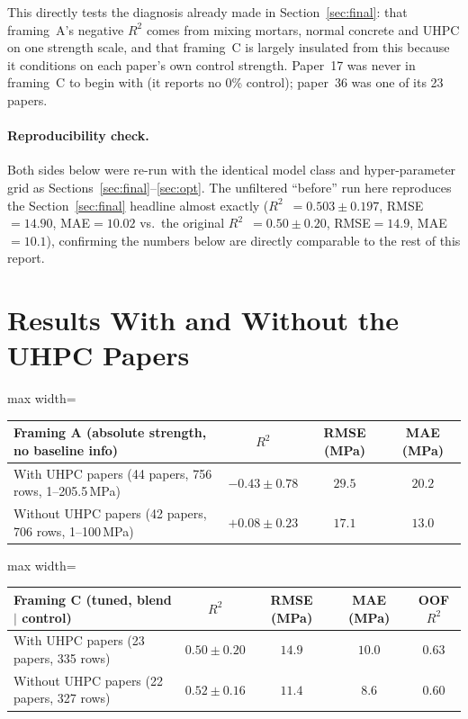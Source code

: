 \documentclass[11pt]{article}
\newcommand{\R}{$R^2$}
\begin{document}
This directly tests the diagnosis already made in Section~\ref{sec:final}: that
framing~A's negative \R{} comes from mixing mortars, normal concrete and UHPC on one
strength scale, and that framing~C is largely insulated from this because it
conditions on each paper's own control strength. Paper~17 was never in framing~C to
begin with (it reports no 0\% control); paper~36 was one of its 23 papers.

\paragraph{Reproducibility check.} Both sides below were re-run with the identical
model class and hyper-parameter grid as Sections~\ref{sec:final}--\ref{sec:opt}. The
unfiltered ``before'' run here reproduces the Section~\ref{sec:final} headline almost
exactly (\R{}~$=0.503\pm0.197$, RMSE$=14.90$, MAE$=10.02$ vs.\ the original
\R{}~$=0.50\pm0.20$, RMSE$=14.9$, MAE$=10.1$), confirming the numbers below are
directly comparable to the rest of this report.

\section{Results With and Without the UHPC Papers}
\label{sec:part2-results}
\begin{center}\small
\begin{adjustbox}{max width=\linewidth}
\begin{tabular}{lccc}
\toprule
\textbf{Framing A} (absolute strength, no baseline info) & \R{} & RMSE (MPa) & MAE (MPa) \\
\midrule
With UHPC papers (44 papers, 756 rows, 1--205.5\,MPa) & $-0.43\pm0.78$ & $29.5$ & $20.2$ \\
Without UHPC papers (42 papers, 706 rows, 1--100\,MPa) & $\mathbf{+0.08\pm0.23}$ & $\mathbf{17.1}$ & $\mathbf{13.0}$ \\
\bottomrule
\end{tabular}
\end{adjustbox}
\end{center}

\begin{center}\footnotesize
\begin{adjustbox}{max width=\linewidth}
\begin{tabular}{lcccc}
\toprule
\textbf{Framing C} (tuned, blend $\mid$ control) & \R{} & RMSE (MPa) & MAE (MPa) & OOF \R{} \\
\midrule
With UHPC papers (23 papers, 335 rows) & $0.50\pm0.20$ & $14.9$ & $10.0$ & $0.63$ \\
Without UHPC papers (22 papers, 327 rows) & $\mathbf{0.52\pm0.16}$ & $\mathbf{11.4}$ & $\mathbf{8.6}$ & $0.60$ \\
\bottomrule
\end{tabular}
\end{adjustbox}
\end{center}
\end{document}
